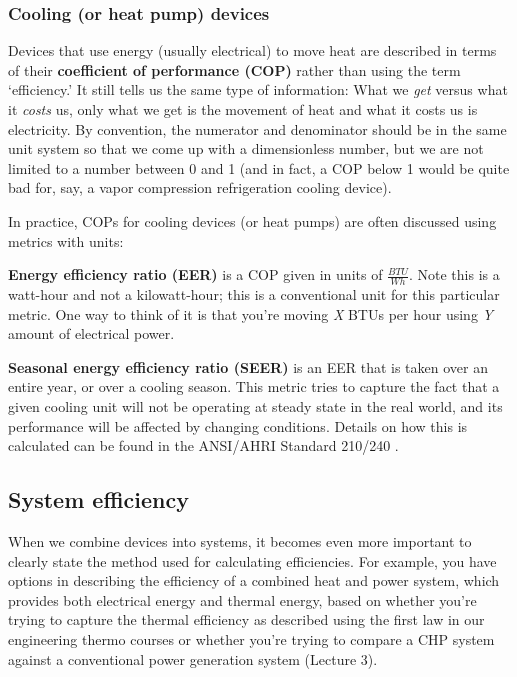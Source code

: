 \documentclass[10pt]{article}
\begin{document}
\subsubsection{Cooling (or heat pump) devices}

Devices that use energy (usually electrical) to move heat are described in terms of their \textbf{coefficient of performance (COP)} rather than using the term `efficiency.' It still tells us the same type of information: What we \textit{get} versus what it \textit{costs} us, only what we get is the movement of heat and what it costs us is electricity. By convention, the numerator and denominator should be in the same unit system so that we come up with a dimensionless number, but we are not limited to a number between 0 and 1 (and in fact, a COP below 1 would be quite bad for, say, a vapor compression refrigeration cooling device).

In practice, COPs for cooling devices (or heat pumps) are often discussed using metrics with units:
\smallskip

\textbf{Energy efficiency ratio (EER)} is a COP given in units of $\frac{BTU}{Wh}$. Note this is a watt-hour and not a kilowatt-hour; this is a conventional unit for this particular metric. One way to think of it is that you're moving \textit{X} BTUs per hour using \textit{Y} amount of electrical power.

\textbf{Seasonal energy efficiency ratio (SEER)} is an EER that is taken over an entire year, or over a cooling season. This metric tries to capture the fact that a given cooling unit will not be operating at steady state in the real world, and its performance will be affected by changing conditions. Details on how this is calculated can be found in the ANSI/AHRI Standard 210/240 \cite{ANSIAHRI_Standard_2102017-ca}.

\subsection{System efficiency}

When we combine devices into systems, it becomes even more important to clearly state the method used for calculating efficiencies. For example, you have options \cite{Us_epa2015-xj} in describing the efficiency of a combined heat and power system, which provides both electrical energy and thermal energy, based on whether you're trying to capture the thermal efficiency as described using the first law in our engineering thermo courses or whether you're trying to compare a CHP system against a conventional power generation system (Lecture 3).
\end{document}
